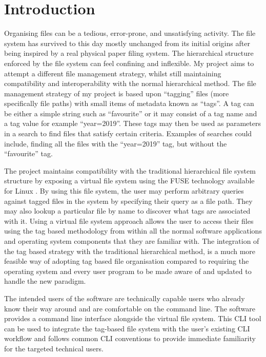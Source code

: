 \chapter{Introduction}
\vspace{1cm}

Organising files can be a tedious, error-prone, and unsatisfying activity. The
file system has survived to this day mostly unchanged from its initial origins
\cite{multics-fs} after being inspired by a real physical paper filing system.
The hierarchical structure enforced by the file system can feel confining and
inflexible. My project aims to attempt a different file management strategy,
whilst still maintaining compatibility and interoperability with the normal
hierarchical method. The file management strategy of my project is based upon
``tagging'' files (more specifically file paths) with small items of metadata
known as ``tags''. A tag can be either a simple string such as ``favourite'' or
it may consist of a tag name and a tag value for example ``year=2019''. These
tags may then be used as parameters in a search to find files that satisfy
certain criteria. Examples of searches could include, finding all the files
with the ``year=2019'' tag, but without the ``favourite'' tag.

The project maintains compatibility with the traditional hierarchical file
system structure by exposing a virtual file system using the FUSE technology
available for Linux \cite{kernel-fuse}. By using this file system, the user may
perform arbitrary queries against tagged files in the system by specifying
their query as a file path. They may also lookup a particular file by name to
discover what tags are associated with it. Using a virtual file system approach
allows the user to access their files using the tag based methodology from
within all the normal software applications and operating system components
that they are familiar with. The integration of the tag based strategy with the
traditional hierarchical method, is a much more feasible way of adopting tag
based file organisation compared to requiring the operating system and every
user program to be made aware of and updated to handle the new paradigm.

The intended users of the software are technically capable users who already
know their way around and are comfortable on the command line. The software
provides a command line interface alongside the virtual file system. This CLI
tool can be used to integrate the tag-based file system with the user's
existing CLI workflow and follows common CLI conventions to provide immediate
familiarity for the targeted technical users.

